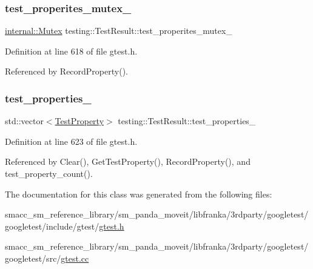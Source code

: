 \mbox{\label{classtesting_1_1TestResult_a58d7d97bd16a04b932e2863153c13dff}} 
\subsubsection{\texorpdfstring{test\+\_\+properites\+\_\+mutex\+\_\+}{test\_properites\_mutex\_}}
{\footnotesize\ttfamily \hyperlink{classtesting_1_1internal_1_1Mutex}{internal\+::\+Mutex} testing\+::\+Test\+Result\+::test\+\_\+properites\+\_\+mutex\+\_\+\hspace{0.3cm}{\ttfamily [private]}}



Definition at line 618 of file gtest.\+h.



Referenced by Record\+Property().

\mbox{\label{classtesting_1_1TestResult_a29cde491988faff4ef2d9f9b6c13d9fa}} 
\subsubsection{\texorpdfstring{test\+\_\+properties\+\_\+}{test\_properties\_}}
{\footnotesize\ttfamily std\+::vector$<$\hyperlink{classtesting_1_1TestProperty}{Test\+Property}$>$ testing\+::\+Test\+Result\+::test\+\_\+properties\+\_\+\hspace{0.3cm}{\ttfamily [private]}}



Definition at line 623 of file gtest.\+h.



Referenced by Clear(), Get\+Test\+Property(), Record\+Property(), and test\+\_\+property\+\_\+count().



The documentation for this class was generated from the following files\+:\begin{DoxyCompactItemize}
\item 
smacc\+\_\+sm\+\_\+reference\+\_\+library/sm\+\_\+panda\+\_\+moveit/libfranka/3rdparty/googletest/googletest/include/gtest/\hyperlink{gtest_8h}{gtest.\+h}\item 
smacc\+\_\+sm\+\_\+reference\+\_\+library/sm\+\_\+panda\+\_\+moveit/libfranka/3rdparty/googletest/googletest/src/\hyperlink{gtest_8cc}{gtest.\+cc}\end{DoxyCompactItemize}
